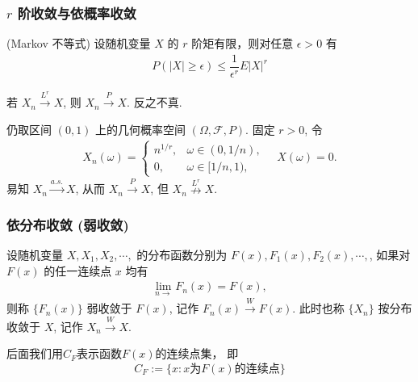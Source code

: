 \begin{frame}
	\frametitle{$r$ 阶收敛与依概率收敛}
	\begin{lem}
		({\rm Markov} 不等式) 设随机变量 $X$ 的 $r$ 阶矩有限，则对任意 $\epsilon>0$ 有
		\begin{eqnarray*}
			P(|X|\geq  \epsilon)\leq \dfrac{1}{\epsilon^r}E|X|^r
		\end{eqnarray*}

	\end{lem}


	\pause
	\begin{thm}
		若 $X_n\stackrel{L^r}{\rightarrow} X$, 则 $X_n\stackrel{P}{\rightarrow} X$. 反之不真.
	\end{thm}


	\pause

	\begin{exam}
		仍取区间 $(0,1)$ 上的几何概率空间 $(\Omega,\mathcal{F}, P)$. 固定 $r>0$, 令
		\begin{eqnarray*}
			X_n(\omega)=\left\{
			\begin{array}{ll}
				n^{1/r},&\omega\in (0, 1/n),\\
				0, &\omega\in [1/n,1),
			\end{array}
			\right. \quad X(\omega)=0.
		\end{eqnarray*}
		易知 $X_n\stackrel{a.s.}{\rightarrow} X$, 从而 $X_n\stackrel{P}{\rightarrow} X$, 但 $X_n\stackrel{L^r}{\nrightarrow} X$.
	\end{exam}
\end{frame}




\begin{frame}
	\frametitle{依分布收敛 (弱收敛)}
	\begin{defi}
		设随机变量 $X,X_1, X_2,\cdots,$ 的分布函数分别为 $F (x), F_1 (x),F_2 (x),\cdots,$, 如果对 $F (x)$ 的任一连续点 $x$ 均有
		\begin{eqnarray}\label{eq:weakdefn}
			\lim_{n\rightarrow}F_n(x)=F(x),
		\end{eqnarray}
		则称 $\{F_n (x)\}$ 弱收敛于 $F (x)$, 记作 $F_n (x)\stackrel{W}{\rightarrow} F (x)$. 此时也称 $\{X_n\}$ 按分布收敛于 $X$, 记作 $X_n\stackrel{W}{\rightarrow} X$.
	\end{defi}
	\pause
	\begin{rmk}
	后面我们用$C_F$表示函数$F(x)$的连续点集， 即
	\[C_F:=\{x: x\mbox{为}F(x)\mbox{的连续点}  \}\]
	\end{rmk}

\end{frame}

